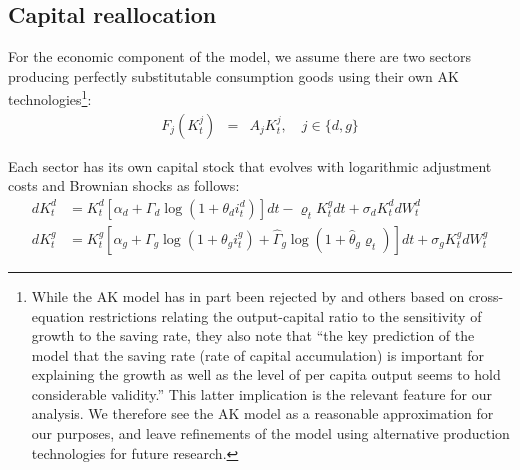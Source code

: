 \documentclass[12pt]{article}
\begin{document}
\begin{appendices}
{}

\newpage 
\clearpage 

\section{Capital reallocation}

For the economic component of the model, we assume there are two sectors producing perfectly substitutable consumption goods using their own AK technologies\footnote{While the AK model has in part been rejected by \cite{bernanke2001growth} and others based on cross-equation restrictions relating the output-capital ratio to the sensitivity of growth to the saving rate, they also note that ``the key prediction of the model that the saving rate (rate of capital accumulation) is important for explaining the growth as well as the level of per capita output seems to hold considerable validity.'' This latter implication is the relevant feature for our analysis. We therefore see the AK model as a reasonable approximation for our purposes, and leave refinements of the model using alternative production technologies for future research.}: 
\begin{eqnarray*}
F_j(K^j_{t}) & = & A_{j} K^j_{t}, \quad j \in \{d,g\} 
\end{eqnarray*}

Each sector has its own capital stock that evolves with logarithmic adjustment costs and Brownian shocks as follows:
% 
\begin{align*}
dK^d_{t} & = K^d_{t}[\alpha_{d}+\Gamma_d \log (1+ \theta_d i^d_{t})]dt - \varrho_t K^g_t dt + \sigma_{d} K^d_{t} dW^{d}_t \\
dK^g_{t} & = K^g_{t}[\alpha_{g}+\Gamma_g \log (1 + \theta_g i^g_{t}) + \hat{\Gamma}_g \log (1 + \hat{\theta}_g \varrho_{t})]dt + \sigma_{g} K^g_{t} dW^{g}_t
\end{align*}


\end{appendices}
\end{document}
